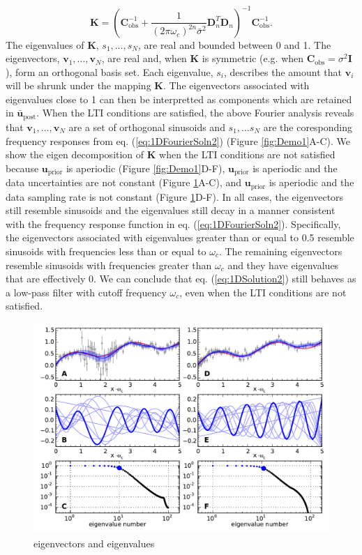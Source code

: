 \documentclass[10pt,a4paper]{article}
\begin{document}
\begin{equation}\label{eq:Kernel}
\mathbf{K} = (\mathbf{C}_\mathrm{obs}^{-1} + 
              \frac{1}{(2\pi\omega_c)^{2n}\bar{\sigma}^2}\mathbf{D}_n^T\mathbf{D}_n)^{-1}\mathbf{C}_\mathrm{obs}^{-1}.
\end{equation}
The eigenvalues of $\mathbf{K}$, $s_1, \dots, s_N$, are real and bounded between 0 and 1.  The eigenvectors, $\mathbf{v}_1, \dots,\mathbf{v}_N$, are real and, when $\mathbf{K}$ is symmetric (e.g. when $\mathbf{C}_\mathrm{obs} = \sigma^2 \mathbf{I}$), form an orthogonal basis set.  Each eigenvalue, $s_i$,  describes the amount that $\mathbf{v}_i$ will be shrunk under the mapping $\mathbf{K}$.  The eigenvectors associated with eigenvalues close to 1 can then be interpretted as components which are retained in $\mathbf{\bar{u}}_\mathrm{post}$. When the LTI conditions are satisfied, the above Fourier analysis reveals that $\mathbf{v}_1, \dots, \mathbf{v}_N$ are a set of orthogonal sinusoids and $s_1, \dots s_N$ are the coresponding frequency responses from eq. (\ref{eq:1DFourierSoln2}) (Figure \ref{fig:Demo1}A-C). We show the eigen decomposition of $\mathbf{K}$ when the LTI conditions are not satisfied because $\mathbf{u}_\mathrm{prior}$ is aperiodic (Figure \ref{fig:Demo1}D-F), $\mathbf{u}_\mathrm{prior}$ is aperiodic and the data uncertainties are not constant (Figure \ref{fig:Demo2}A-C), and $\mathbf{u}_\mathrm{prior}$ is aperiodic and the data sampling rate is not constant (Figure \ref{fig:Demo2}D-F). In all cases, the eigenvectors still resemble sinusoids and the eigenvalues still decay in a manner consistent with the frequency response function in eq. (\ref{eq:1DFourierSoln2}). Specifically, the eigenvectors associated with eigenvalues greater than or equal to 0.5 resemble sinusoids with frequencies less than or equal to $\omega_c$. The remaining eigenvectors resemble sinusoids with frequencies greater than $\omega_c$ and they have eigenvalues that are effectively 0.  We can conclude that eq. (\ref{eq:1DSolution2}) still behaves as a low-pass filter with cutoff frequency $\omega_c$, even when the LTI conditions are not satisfied.  

\begin{figure}
\includegraphics[scale=1.0]{figures/figure3}
\caption{eigenvectors and eigenvalues}   
\label{fig:Demo2}
\end{figure}
\end{document}
